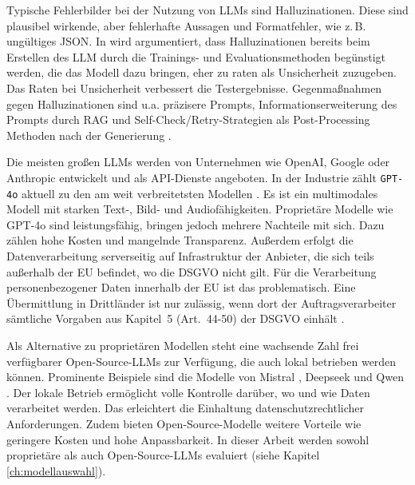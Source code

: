 Typische Fehlerbilder bei der Nutzung von \acp{LLM} sind Halluzinationen. Diese sind plausibel wirkende, aber fehlerhafte Aussagen und Formatfehler, wie z.\,B. ungültiges JSON. In \cite{kalai2025languagemodelshallucinate} wird argumentiert, dass Halluzinationen bereits beim Erstellen des \ac{LLM} durch die Trainings- und Evaluationsmethoden begünstigt werden, die das Modell dazu bringen, eher zu raten als Unsicherheit zuzugeben. Das Raten bei Unsicherheit verbessert die Testergebnisse. Gegenmaßnahmen gegen Halluzinationen sind u.a. präzisere Prompts, Informationserweiterung des Prompts durch \ac{RAG} und Self-Check/Retry-Strategien als Post-Processing Methoden nach der Generierung \cite{ji2023hallucinationsurvey}.

Die meisten großen \acp{LLM} werden von Unternehmen wie OpenAI, Google oder Anthropic entwickelt und als API-Dienste angeboten. In der Industrie zählt \texttt{GPT-4o} aktuell zu den am weit verbreitetsten Modellen \cite{openai-hello-gpt-4o}. Es ist ein multimodales Modell mit starken Text-, Bild- und Audiofähigkeiten. Proprietäre Modelle wie GPT-4o sind leistungsfähig, bringen jedoch mehrere Nachteile mit sich. Dazu zählen hohe Kosten und mangelnde Transparenz. Außerdem erfolgt die Datenverarbeitung serverseitig auf Infrastruktur der Anbieter, die sich teils außerhalb der \ac{EU} befindet, wo die \ac{DSGVO} nicht gilt. Für die Verarbeitung personenbezogener Daten innerhalb der \ac{EU} ist das problematisch. Eine Übermittlung in Drittländer ist nur zulässig, wenn dort der Auftragsverarbeiter sämtliche Vorgaben aus Kapitel~5 (Art.~44-50) der \ac{DSGVO} einhält \cite{GDPR2016}.

Als Alternative zu proprietären Modellen steht eine wachsende Zahl frei verfügbarer Open-Source-\acp{LLM} zur Verfügung, die auch lokal betrieben werden können. Prominente Beispiele sind die Modelle von Mistral \cite{mistralai}, Deepseek \cite{deepseek} und Qwen \cite{qwen}. Der lokale Betrieb ermöglicht volle Kontrolle darüber, wo und wie Daten verarbeitet werden. Das erleichtert die Einhaltung datenschutzrechtlicher Anforderungen. Zudem bieten Open-Source-Modelle weitere Vorteile wie geringere Kosten und hohe Anpassbarkeit. In dieser Arbeit werden sowohl proprietäre als auch Open-Source-\acp{LLM} evaluiert (siehe Kapitel \ref{ch:modellauswahl}).